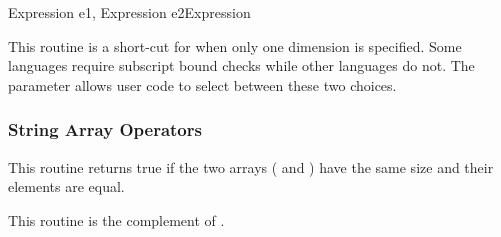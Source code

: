 	{Expression e1, Expression e2}{Expression}
\begin{functionality}
This routine is a short-cut for when only one dimension is specified.
Some languages require subscript bound checks while other languages do
not.  The  parameter allows user code to select
between these two choices.
\end{functionality}

\subsubsection{String Array Operators}

\begin{functionality}
This routine returns true if the two arrays ( and )
have the same size and their elements are equal.  
\end{functionality}

\begin{functionality}
This routine is the complement of .  
\end{functionality}

